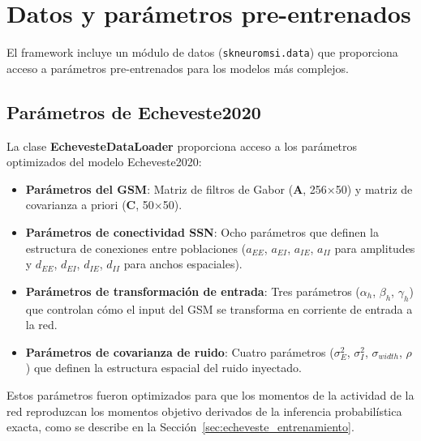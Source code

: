 
\section{Datos y parámetros pre-entrenados}
\label{sec:snmsi_datos}

El framework incluye un módulo de datos (\texttt{skneuromsi.data}) que proporciona acceso a parámetros pre-entrenados para los modelos más complejos.

\subsection{Parámetros de Echeveste2020}
\label{subsec:snmsi_datos_echeveste}

La clase \textbf{EchevesteDataLoader} proporciona acceso a los parámetros optimizados del modelo Echeveste2020:

\begin{itemize}
    \item \textbf{Parámetros del GSM}: Matriz de filtros de Gabor ($\mathbf{A}$, 256×50) y matriz de covarianza a priori ($\mathbf{C}$, 50×50).

    \item \textbf{Parámetros de conectividad SSN}: Ocho parámetros que definen la estructura de conexiones entre poblaciones ($a_{EE}$, $a_{EI}$, $a_{IE}$, $a_{II}$ para amplitudes y $d_{EE}$, $d_{EI}$, $d_{IE}$, $d_{II}$ para anchos espaciales).

    \item \textbf{Parámetros de transformación de entrada}: Tres parámetros ($\alpha_h$, $\beta_h$, $\gamma_h$) que controlan cómo el input del GSM se transforma en corriente de entrada a la red.

    \item \textbf{Parámetros de covarianza de ruido}: Cuatro parámetros ($\sigma_E^2$, $\sigma_I^2$, $\sigma_{width}$, $\rho$) que definen la estructura espacial del ruido inyectado.
\end{itemize}

Estos parámetros fueron optimizados para que los momentos de la actividad de la red reproduzcan los momentos objetivo derivados de la inferencia probabilística exacta, como se describe en la Sección~\ref{sec:echeveste_entrenamiento}.


